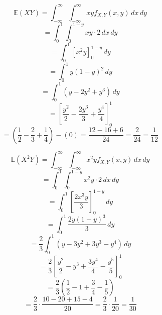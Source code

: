\documentclass{article}
\begin{document}
   
    \[\mathbb{E}(XY) = \int_{-\infty}^{\infty} \int_{-\infty}^{\infty} xy f_{X,Y}(x,y) \, dx \, dy\]
    \[= \int_{0}^{1} \int_{0}^{1-y} xy \cdot 2 \, dx \, dy\]
    \[= \int_{0}^{1} \left[x^2y\right]_{0}^{1-y} \, dy\]
    \[= \int_{0}^{1} y(1-y)^2 \, dy\] 
    \[= \int_{0}^{1} (y-2y^2+y^3) \, dy\]
    \[= \left[\frac{y^2}{2}-\frac{2y^3}{3}+\frac{y^4}{4}\right]_{0}^{1}\]
    \[= \left(\frac{1}{2}-\frac{2}{3}+\frac{1}{4}\right) - (0) = \frac{12-16+6}{24} = \frac{2}{24} = \boxed{\frac{1}{12}}\]

    \[\mathbb{E}(X^2Y) = \int_{-\infty}^{\infty} \int_{-\infty}^{\infty} x^2y f_{X,Y}(x,y) \, dx \, dy\]
    \[= \int_{0}^{1} \int_{0}^{1-y} x^2y \cdot 2 \, dx \, dy\]
    \[= \int_{0}^{1} \left[\frac{2x^3y}{3}\right]_{0}^{1-y} \, dy\]
    \[= \int_{0}^{1} \frac{2y(1-y)^3}{3} \, dy\]
    \[= \frac{2}{3}\int_{0}^{1} (y-3y^2+3y^3-y^4) \, dy\]
    \[= \frac{2}{3}\left[\frac{y^2}{2}-y^3+\frac{3y^4}{4}-\frac{y^5}{5}\right]_{0}^{1}\]
    \[= \frac{2}{3}\left(\frac{1}{2}-1+\frac{3}{4}-\frac{1}{5}\right)\]
    \[= \frac{2}{3} \cdot \frac{10-20+15-4}{20} = \frac{2}{3} \cdot \frac{1}{20} = \boxed{\frac{1}{30}}\]

    \pagebreak















        
\end{document}
